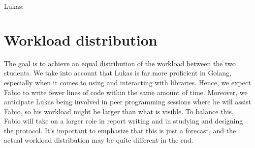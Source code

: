 \documentclass[a4paper,english,10pt,NET]{tumarticle}
\begin{document}
Lukas:


\section{Workload distribution}

The goal is to achieve an equal distribution of the workload between the two students. We take into account that Lukas is far more proficient in Golang, especially when it comes to using and interacting with libraries. Hence, we expect Fabio to write fewer lines of code within the same amount of time. Moreover, we anticipate Lukas being involved in peer programming sessions where he will assist Fabio, so his workload might be larger than what is visible. To balance this, Fabio will take on a larger role in report writing and in studying and designing the protocol. It's important to emphasize that this is just a forecast, and the actual workload distribution may be quite different in the end.


\todos
\end{document}
